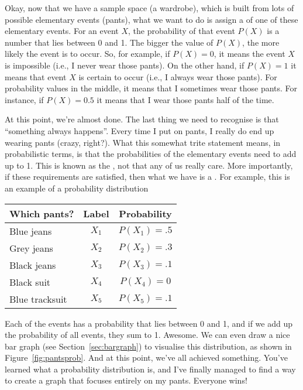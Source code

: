 Okay, now that we have a sample space (a wardrobe), which is built from lots of possible elementary events (pants), what we want to do is assign a  of one of these elementary events. For an event $X$, the probability of that event $P(X)$ is a number that lies between 0 and 1. The bigger the value of $P(X)$, the more likely the event is to occur. So, for example, if $P(X) = 0$, it means the event $X$ is impossible (i.e., I never wear those pants). On the other hand, if $P(X) = 1$ it means that event $X$ is certain to occur (i.e., I always wear those pants). For probability values in the middle, it means that I sometimes wear those pants. For instance, if $P(X) = 0.5$ it means that I wear those pants half of the time. 

At this point, we're almost done. The last thing we need to recognise is that ``something always happens''. Every time I put on pants, I really do end up wearing pants (crazy, right?). What this somewhat trite statement means, in probabilistic terms, is that the probabilities of the elementary events need to add up to 1. This is known as the , not that any of us really care. More importantly, if these requirements are satisfied, then what we have is a . For example, this is an example of a probability distribution
\begin{center}
\begin{tabular}{lcc} 
Which pants?     &  Label & Probability \\ \hline
Blue jeans &  $X_1$ & $P(X_1) = .5 $ \\
Grey jeans  &  $X_2$ & $P(X_2) = .3 $ \\
Black jeans      &  $X_3$ & $P(X_3) = .1 $ \\
Black suit       &  $X_4$ & $P(X_4) = 0  $ \\
Blue tracksuit  &  $X_5$ & $P(X_5) = .1 $ \\
\end{tabular}
\end{center}
Each of the events has a probability that lies between 0 and 1, and if we add up the probability of all events, they sum to 1. Awesome. We can even draw a nice bar graph (see Section~\ref{sec:bargraph}) to visualise this distribution, as shown in Figure~\ref{fig:pantsprob}. And at this point, we've all achieved something. You've learned what a probability distribution is, and I've finally managed to find a way to create a graph that focuses entirely on my pants. Everyone wins!

